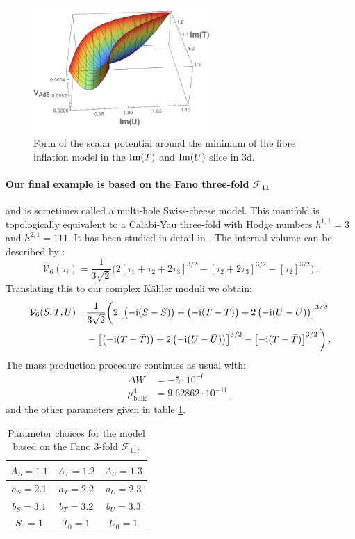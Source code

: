 \documentclass[a4paper,12pt]{report}
\newcommand{\be}{\begin{equation}}
\newcommand{\ee}{\end{equation}}
\newcommand{\bea}{\begin{equation}\begin{aligned}}
\newcommand{\eea}{\end{aligned}\end{equation}}
\def\rmi{{\rm i}}
\def\rmim{{\rm Im}}
\begin{document}
\begin{figure}[H]
     \centering
     \includegraphics[width=0.6\textwidth]{fibre3DLarge.pdf}
     \caption{Form of the scalar potential around the minimum of the fibre inflation model in the $\rmim(T)$ and $\rmim(U)$ slice in 3d.}
     \label{fig:fibre3d}
\end{figure}

\paragraph{Our final example is based on the Fano three-fold $\bm{\mathcal{F}_{11}}$} and is sometimes called a multi-hole Swiss-cheese model. This manifold is topologically equivalent to a Calabi-Yau three-fold with Hodge numbers $h^{1,1} = 3$ and $h^{2,1} =111$. It has been studied in detail in \cite{Denef:2004dm}. The internal volume can be described by \cite{Cicoli:2008gp}:
\be 
\mathcal{V}_6 (\tau_i) = \frac{1}{3 \sqrt{2}} \bigg(2[\tau_1  + \tau_2 + 2 \tau_3]^{3/2} - [\tau_2 + 2 \tau_3]^{3/2} - [\tau_2]^{3/2}\bigg)\,.
\ee
Translating this to our complex Kähler moduli we obtain:
\bea
\mathcal{V}_6(S,T,U) = &\frac{1}{3 \sqrt{2}} \bigg( 2 \left[ \left(-\rmi (S-\bar{S})\right) +\left(-\rmi (T-\bar{T})\right) +2 \left(-\rmi (U-\bar{U})\right)\right]^{3/2}\\
&- \left[\left(-\rmi (T-\bar{T})\right) + 2\left(-\rmi (U-\bar{U})\right) \right]^{3/2} - \left[-\rmi (T-\bar{T})\right]^{3/2}\bigg)\,.
\eea
The mass production procedure continues as usual with:
\bea
\Delta W &= - 5 \cdot 10^{-6}\\
\mu^4_{\text{bulk}} &= 9.62862 \cdot 10^{-11}\,,
\eea
and the other parameters given in table \ref{tab:swisspara}.

\begin{table}[htb]
\centering
\begin{tabular}{|c|c|c|}\hline
$A_S = 1.1$ & $A_T = 1.2$ & $A_U =1.3$\\\hline
$a_S = 2.1$ & $a_T = 2.2$ & $a_U = 2.3$\\\hline
$b_S = 3.1$ & $b_T = 3.2$ & $b_U = 3.3$\\\hline
$S_0 = 1$ & $T_0 = 1$ & $U_0 = 1$\\\hline
\end{tabular}
\caption{ Parameter choices for the model based on the Fano 3-fold $\mathcal{F}_{11}$.}
\label{tab:swisspara}
\end{table}
\end{document}

